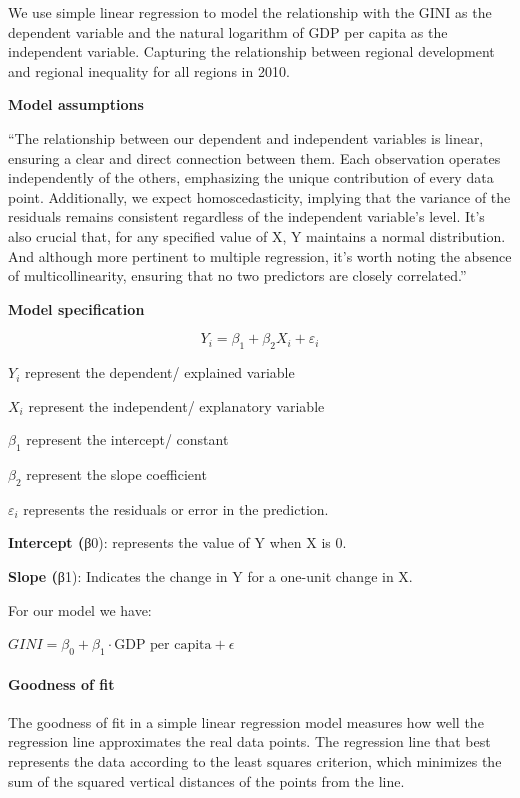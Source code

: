 \documentclass[
  a4paper,
  DIV=11,
  numbers=noendperiod]{scrartcl}
\let\oldparagraph\paragraph
\renewcommand{\paragraph}[1]{\oldparagraph{#1}\mbox{}}
\begin{document}
We use simple linear regression to model the relationship with the GINI
as the dependent variable and the natural logarithm of GDP per capita as
the independent variable. Capturing the relationship between regional
development and regional inequality for all regions in 2010.

\textbf{Model assumptions}

``The relationship between our dependent and independent variables is
linear, ensuring a clear and direct connection between them. Each
observation operates independently of the others, emphasizing the unique
contribution of every data point. Additionally, we expect
homoscedasticity, implying that the variance of the residuals remains
consistent regardless of the independent variable's level. It's also
crucial that, for any specified value of X, Y maintains a normal
distribution. And although more pertinent to multiple regression, it's
worth noting the absence of multicollinearity, ensuring that no two
predictors are closely correlated.''

\textbf{Model specification}

\[
Y_i = β_1 + β_2X_i + ε_i
\]

\(Y_i\) represent the dependent/ explained variable

\(X_i\) represent the independent/ explanatory variable

\(β_1\) represent the intercept/ constant

\(β_2\) represent the slope coefficient

\(ε_i\) represents the residuals or error in the prediction.

\textbf{Intercept (}β0\hspace{0pt}): represents the value of Y when X is
0.

\textbf{Slope (}β1\hspace{0pt}): Indicates the change in Y for a
one-unit change in X.

For our model we have:

\(GINI = \beta_{0} + \beta_{1} \cdot \text{GDP per capita} + \epsilon\)

\hypertarget{goodness-of-fit}{%
\paragraph{\texorpdfstring{\textbf{Goodness of
fit}}{Goodness of fit}}\label{goodness-of-fit}}

The goodness of fit in a simple linear regression model measures how
well the regression line approximates the real data points. The
regression line that best represents the data according to the least
squares criterion, which minimizes the sum of the squared vertical
distances of the points from the line.
\end{document}
